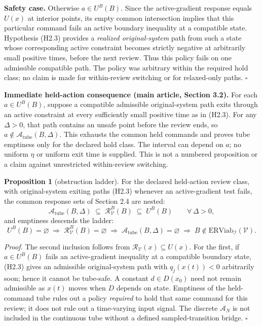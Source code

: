 \documentclass[11pt]{article}
\theoremstyle{definition}
\newtheorem{proposition}{Proposition}
\begin{document}
\textbf{Safety case.} Otherwise \(a\in U^B(B)\). Since the active-gradient response equals \(U(x)\) at interior points, its empty common intersection implies that this particular command fails an active boundary inequality at a compatible state. Hypothesis (H2.3) provides a \emph{realized original-system} path from such a state whose corresponding active constraint becomes strictly negative at arbitrarily small positive times, before the next review. Thus this policy fails on one admissible compatible path. The policy was arbitrary within the required hold class; no claim is made for within-review switching or for relaxed-only paths. \ensuremath{\square}

\noindent\textbf{Immediate held-action consequence (main article, Section 3.2).}
For each \(a\in U^B(B)\), suppose a compatible admissible
original-system path exits through an active constraint at every
sufficiently small positive time as in (H2.3). For any \(\Delta>0\),
that path contains an unsafe point before the review ends, so
\(a\notin\mathcal A_{\mathrm{tube}}(B,\Delta)\). This exhausts the
common held commands and proves tube emptiness only for the declared
hold class. The interval can depend on \(a\); no uniform \(\eta\)
or uniform exit time is supplied. This is not a numbered proposition
or a claim against unrestricted within-review switching.

\begin{proposition}[obstruction ladder]\label{prop:ladder}
For the declared held-action review class, with original-system exiting paths (H2.3) whenever an active-gradient test fails, the common response sets
of Section 2.4 are nested:
\[\mathcal{A}_{\mathrm{tube}}(B,\Delta) \;\subseteq\; \mathcal{R}_{\mathcal{V}}^B(B) \;\subseteq\; U^B(B) \qquad \forall\,\Delta>0,\]
and emptiness descends the ladder:
\[U^B(B)=\varnothing \;\Longrightarrow\; \mathcal{R}_{\mathcal{V}}^B(B)=\varnothing \;\Longrightarrow\; \mathcal{A}_{\mathrm{tube}}(B,\Delta)=\varnothing \;\Longrightarrow\; B\notin\mathrm{ERViab}_{\mathcal{I}}(\mathcal{V}).\]
\end{proposition}

\emph{Proof.} The second inclusion follows from \(\mathcal R_{\mathcal V}(x)\subseteq U(x)\). For the first, if \(a\in U^B(B)\) fails an active-gradient inequality at a compatible boundary state, (H2.3) gives an admissible original-system path with \(q_j(x(t))<0\) arbitrarily soon; hence it cannot be tube-safe. A constant \(d\in D(x_0)\) need not remain admissible as \(x(t)\) moves when \(D\) depends on state. Emptiness of the held-command tube rules out a policy \emph{required} to hold that same command for this review; it does not rule out a time-varying input signal. The discrete \(\mathcal A_N\) is not included in the continuous tube without a defined sampled-transition bridge. \ensuremath{\square}
\end{document}
